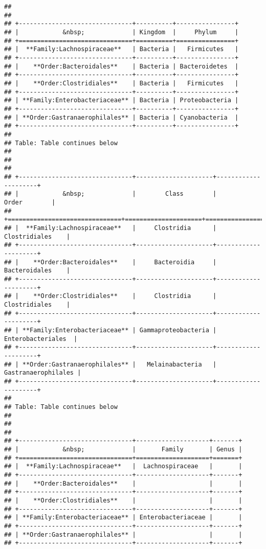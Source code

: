 \documentclass[
  oneside]{book}
\begin{document}
\begin{verbatim}
## 
## 
## +-------------------------------+----------+----------------+
## |            &nbsp;             | Kingdom  |     Phylum     |
## +===============================+==========+================+
## |  **Family:Lachnospiraceae**   | Bacteria |   Firmicutes   |
## +-------------------------------+----------+----------------+
## |    **Order:Bacteroidales**    | Bacteria | Bacteroidetes  |
## +-------------------------------+----------+----------------+
## |    **Order:Clostridiales**    | Bacteria |   Firmicutes   |
## +-------------------------------+----------+----------------+
## | **Family:Enterobacteriaceae** | Bacteria | Proteobacteria |
## +-------------------------------+----------+----------------+
## | **Order:Gastranaerophilales** | Bacteria | Cyanobacteria  |
## +-------------------------------+----------+----------------+
## 
## Table: Table continues below
## 
##  
## 
## +-------------------------------+---------------------+---------------------+
## |            &nbsp;             |        Class        |        Order        |
## +===============================+=====================+=====================+
## |  **Family:Lachnospiraceae**   |     Clostridia      |    Clostridiales    |
## +-------------------------------+---------------------+---------------------+
## |    **Order:Bacteroidales**    |     Bacteroidia     |    Bacteroidales    |
## +-------------------------------+---------------------+---------------------+
## |    **Order:Clostridiales**    |     Clostridia      |    Clostridiales    |
## +-------------------------------+---------------------+---------------------+
## | **Family:Enterobacteriaceae** | Gammaproteobacteria |  Enterobacteriales  |
## +-------------------------------+---------------------+---------------------+
## | **Order:Gastranaerophilales** |   Melainabacteria   | Gastranaerophilales |
## +-------------------------------+---------------------+---------------------+
## 
## Table: Table continues below
## 
##  
## 
## +-------------------------------+--------------------+-------+
## |            &nbsp;             |       Family       | Genus |
## +===============================+====================+=======+
## |  **Family:Lachnospiraceae**   |  Lachnospiraceae   |       |
## +-------------------------------+--------------------+-------+
## |    **Order:Bacteroidales**    |                    |       |
## +-------------------------------+--------------------+-------+
## |    **Order:Clostridiales**    |                    |       |
## +-------------------------------+--------------------+-------+
## | **Family:Enterobacteriaceae** | Enterobacteriaceae |       |
## +-------------------------------+--------------------+-------+
## | **Order:Gastranaerophilales** |                    |       |
## +-------------------------------+--------------------+-------+
\end{verbatim}
\end{document}
